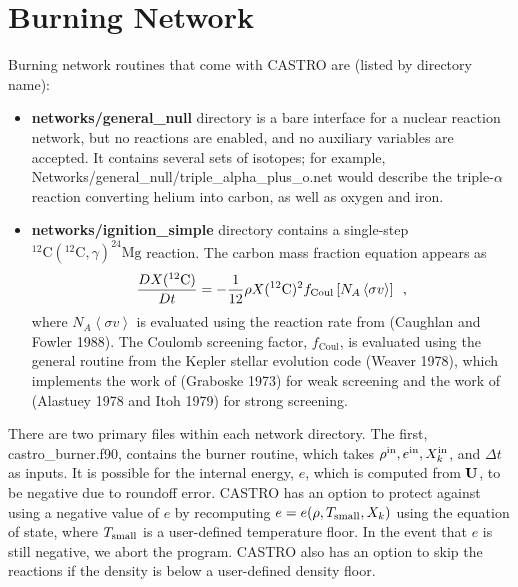 \section{Burning Network}
Burning network routines that come with CASTRO are (listed by directory name):
\begin{itemize}
\item {\bf networks/general\_null} directory is a bare interface for a nuclear reaction network, but no reactions are enabled, and no auxiliary variables are accepted. It contains several sets of isotopes; for example, Networks/general\_null/triple\_alpha\_plus\_o.net would describe the triple-$\alpha$ reaction converting helium into carbon, as well as oxygen and iron.
\item {\bf networks/ignition\_simple} directory contains a single-step
$^{12}\mathrm{C}(^{12}\mathrm{C},\gamma)^{24}\mathrm{Mg}$ reaction.
The carbon mass fraction equation appears as
\begin{equation}
\frac{D X(^{12}\mathrm{C})}{Dt} = - \frac{1}{12} \rho X(^{12}\mathrm{C})^2
    f_\mathrm{Coul} \left [N_A \left <\sigma v \right > \right]\enskip,
\end{equation}
where $N_A \left <\sigma v\right>$ is evaluated using the reaction
rate from (Caughlan and Fowler 1988).  The Coulomb screening factor,
$f_\mathrm{Coul}$, is evaluated using the general routine from the
Kepler stellar evolution code (Weaver 1978), which implements
the work of (Graboske 1973) for weak screening and the work of
(Alastuey 1978 and Itoh 1979) for strong screening.
\end{itemize}

There are two primary files within each network directory. The first,
castro\_burner.f90, contains the burner routine, 
which takes $\rho^{\rm in}, e^{\rm in}, X_k^{\rm in}$, and $\Delta t$ as inputs.
It is possible for the internal energy, $e$, which is computed from ${\bf U}$, to be
negative due to roundoff error.  CASTRO has an option to protect against using a 
negative value of $e$ by recomputing $e = e(\rho,T_{\rm small},X_k)$ using the 
equation of state, where $T_{\rm small}$ is a user-defined temperature floor.  In the 
event that $e$ is still negative, we abort the program.  CASTRO also has an option to
skip the reactions if the density is below a user-defined density floor.


